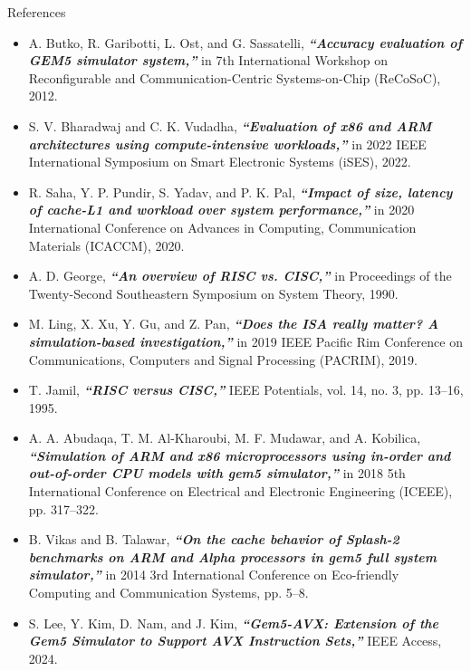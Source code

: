 \begin{frame}[allowframebreaks]{References}
  \begin{itemize}
    \item [{\bf [1]}] A. Butko, R. Garibotti, L. Ost, and G. Sassatelli, \textbf{\textit{“Accuracy evaluation of GEM5 simulator system,”}} in 7th International Workshop on Reconfigurable and Communication-Centric Systems-on-Chip (ReCoSoC), 2012.
    
    \item [{\bf [2]}] S. V. Bharadwaj and C. K. Vudadha, \textbf{\textit{“Evaluation of x86 and ARM architectures using compute-intensive workloads,”}} in 2022 IEEE International Symposium on Smart Electronic Systems (iSES), 2022.
    
    \item [{\bf [3]}] R. Saha, Y. P. Pundir, S. Yadav, and P. K. Pal, \textbf{\textit{“Impact of size, latency of cache-L1 and workload over system performance,”}} in 2020 International Conference on Advances in Computing, Communication Materials (ICACCM), 2020.
    
    \item [{\bf [4]}] A. D. George, \textbf{\textit{“An overview of RISC vs. CISC,”}} in Proceedings of the Twenty-Second Southeastern Symposium on System Theory, 1990.
    
    \item [{\bf [5]}] M. Ling, X. Xu, Y. Gu, and Z. Pan, \textbf{\textit{“Does the ISA really matter? A simulation-based investigation,”}} in 2019 IEEE Pacific Rim Conference on Communications, Computers and Signal Processing (PACRIM), 2019.
    
    \item [{\bf [6]}] T. Jamil, \textbf{\textit{“RISC versus CISC,”}} IEEE Potentials, vol. 14, no. 3, pp. 13–16, 1995.
    
    \item [{\bf [7]}] A. A. Abudaqa, T. M. Al-Kharoubi, M. F. Mudawar, and A. Kobilica, \textbf{\textit{“Simulation of ARM and x86 microprocessors using in-order and out-of-order CPU models with gem5 simulator,”}} in 2018 5th International Conference on Electrical and Electronic Engineering (ICEEE), pp. 317–322.
    
    \item [{\bf [8]}] B. Vikas and B. Talawar, \textbf{\textit{“On the cache behavior of Splash-2 benchmarks on ARM and Alpha processors in gem5 full system simulator,”}} in 2014 3rd International Conference on Eco-friendly Computing and Communication Systems, pp. 5–8.
    
    \item [{\bf [9]}] S. Lee, Y. Kim, D. Nam, and J. Kim, \textbf{\textit{“Gem5-AVX: Extension of the Gem5 Simulator to Support AVX Instruction Sets,”}} IEEE Access, 2024.
  \end{itemize}
\end{frame}

